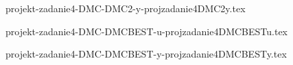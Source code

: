 \begin{figure}[H] 
    \centering
    
    \caption{projekt-zadanie4-DMC-DMC2-y-projzadanie4DMC2y.tex}
    \label{projekt:zad4:figure:projzadanie4DMC2y}
\end{figure}

\begin{figure}[H] 
    \centering
    
    \caption{projekt-zadanie4-DMC-DMCBEST-u-projzadanie4DMCBESTu.tex}
    \label{projekt:zad4:figure:projzadanie4DMCBESTu}
\end{figure}

\begin{figure}[H] 
    \centering
    
    \caption{projekt-zadanie4-DMC-DMCBEST-y-projzadanie4DMCBESTy.tex}
    \label{projekt:zad4:figure:projzadanie4DMCBESTy}
\end{figure}

\newpage
